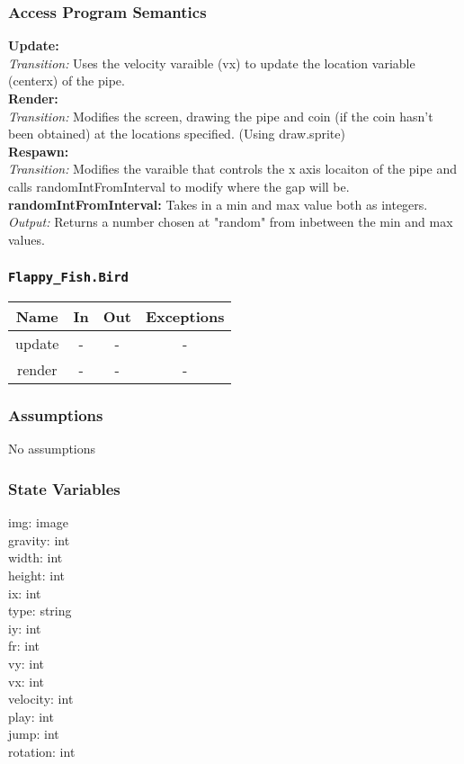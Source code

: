 \documentclass[11pt, oneside]{article}   	%
\begin{document}
\subsubsection*{Access Program Semantics} 
 \textbf{Update:}  \\
 \textit{Transition:} Uses the velocity varaible (vx) to update the location variable (centerx) of the pipe.\\
 \textbf{Render:}  \\
 \textit{Transition:} Modifies the screen, drawing the pipe and coin (if the coin hasn't been obtained) at the locations specified. (Using draw.sprite)\\
 \textbf{Respawn:}  \\
 \textit{Transition:} Modifies the varaible that controls the x axis locaiton of the pipe and calls randomIntFromInterval to modify where the gap will be.\\
 \textbf{randomIntFromInterval:} Takes in a min and max value both as integers. \\
 \textit{Output:} Returns a number chosen at "random" from inbetween the min and max values.\\

\subsubsection*{\texttt{Flappy\_Fish.Bird}}



\begin{center}
\begin{tabular}{ |c|c|c|c| } 
 \hline
 Name & In & Out & Exceptions \\ 
 \hline \hline
 update & - & - & - \\ 
render &  -& - & - \\ 
 \hline
\end{tabular}
\end{center}

\subsubsection*{Assumptions}
No assumptions

\subsubsection*{State Variables}
img: image\\
gravity: int\\
width: int\\
height: int \\
ix: int \\
type: string\\
iy: int \\
fr: int \\
vy: int \\
vx: int \\
velocity: int \\
play: int\\
jump: int \\
rotation: int\\
\end{document}
